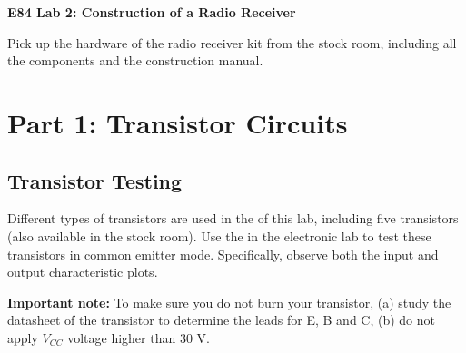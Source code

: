 \usepackage{html}


{\Large \bf E84 Lab 2: Construction of a Radio Receiver}


Pick up the hardware of the radio receiver kit from the stock room,
including all the components and the construction manual.

\section{Part 1: Transistor Circuits}

\subsection{Transistor Testing}

Different types of transistors are used in the 
of this lab, including five
transistors (also available in the stock room). Use the 
in the electronic lab to test these transistors in common emitter mode. 
Specifically, observe both the input and output characteristic plots.

{\bf Important note:} To make sure you do not burn your transistor, 
(a) study the datasheet of the transistor to determine the leads for E, B and C,
(b) do not apply $V_{CC}$ voltage higher than 30 V.


